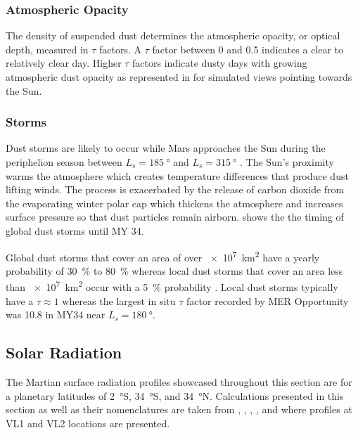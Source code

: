\subsubsection{Atmospheric Opacity}
\label{sec:MartianEnvironment:Dust:AtmosphericOpacity}
The density of suspended dust determines the atmospheric opacity, or optical depth, measured in $\tau$ factors. A $\tau$ factor between 0 and 0.5 indicates a clear to relatively clear day. Higher $\tau$ factors indicate dusty days with growing atmospheric dust opacity as represented in  for simulated views pointing towards the Sun. %

\subsubsection{Storms}
\label{sec:MartianEnvironment:Dust:Storms}

Dust storms are likely to occur while Mars approaches the Sun during the periphelion season between $L_{s} = \SI{185}{\degree}$ and $L_{s} = \SI{315}{\degree}$ . The Sun's proximity warms the atmosphere which creates temperature differences that produce dust lifting winds. The process is exacerbated by the release of carbon dioxide from the evaporating winter polar cap which thickens the atmosphere and increases surface pressure so that dust particles remain airborn.  shows the the timing of global dust storms until \ac{MY} 34.

Global dust storms that cover an area of over \SI{e7}{\kilo\meter\squared} have a yearly probability of \SI{30}{\percent} to \SI{80}{\percent} whereas local dust storms that cover an area less than \SI{e7}{\kilo\meter\squared} occur with a \SI{5}{\percent} probability . Local dust storms typically have a $\tau \approx 1$  whereas the largest in situ $\tau$ factor recorded by \ac{MER} Opportunity was 10.8 in \ac{MY}34 near $L_{s} = \SI{180}{\degree}$.

\subsection{Solar Radiation}
\label{sec:MartianEnvironment:SolarRadiation}

The Martian surface radiation profiles showcased throughout this section are for a planetary latitudes of \SI{2}{\degree}S, \SI{34}{\degree}S, and \SI{34}{\degree}N. Calculations presented in this section as well as their nomenclatures are taken from , , , , and  where profiles at \ac{VL1} and \ac{VL2} locations are presented.

